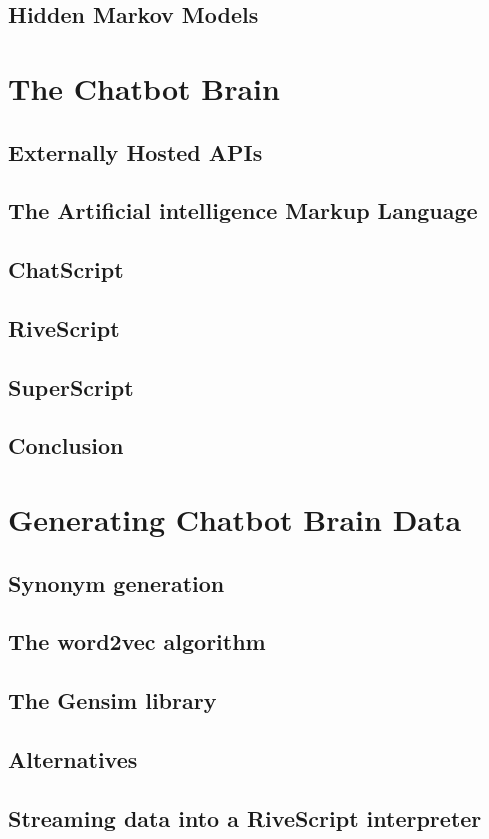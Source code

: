 \documentclass[12pt, twoside, a4paper, draft]{report}
\begin{document}
\subsection{Hidden Markov Models}
\section{The Chatbot Brain}
\subsection{Externally Hosted APIs}
\subsection{The Artificial intelligence Markup Language}
\subsection{ChatScript}
\subsection{RiveScript}
\subsection{SuperScript}
\subsection{Conclusion}
\section{Generating Chatbot Brain Data}
\subsection{Synonym generation}
\subsection{The word2vec algorithm}
\subsection{The Gensim library}
\subsection{Alternatives}
\subsection{Streaming data into a RiveScript interpreter}
\end{document}
